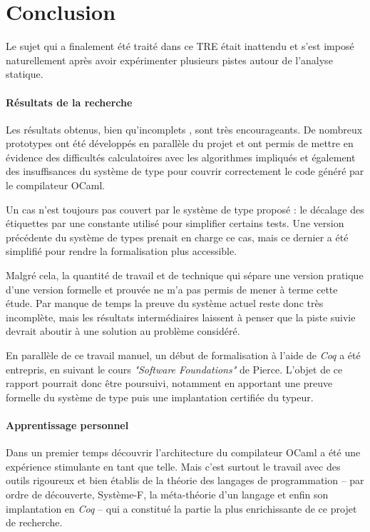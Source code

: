 \section{Conclusion}

Le sujet qui a finalement été traité dans ce TRE était inattendu et s'est
imposé naturellement après avoir expérimenter plusieurs pistes autour de
l'analyse statique.

\paragraph{Résultats de la recherche} Les résultats obtenus, bien qu'incomplets
, sont très encourageants. De nombreux prototypes ont été développés en
parallèle du projet et ont permis de mettre en évidence des difficultés
calculatoires avec les algorithmes impliqués et également des insuffisances du
système de type pour couvrir correctement le code généré par le compilateur
OCaml.

Un cas n'est toujours pas couvert par le système de type proposé : le décalage
des étiquettes par une constante utilisé pour simplifier certains tests.
Une version précédente du système de types prenait en charge ce cas, mais
ce dernier a été simplifié pour rendre la formalisation plus accessible.

Malgré cela, la quantité de travail et de technique qui sépare une version
pratique d'une version formelle et prouvée ne m'a pas permis de mener à terme
cette étude.  Par manque de temps la preuve du système actuel reste donc très
incomplète, mais les résultats intermédiaires laissent à penser que la piste
suivie devrait aboutir à une solution au problème considéré.

En parallèle de ce travail manuel, un début de formalisation à l'aide de
\emph{Coq} a été entrepris, en suivant le cours \emph{"Software Foundations"}
de Pierce. L'objet de ce rapport pourrait donc être poursuivi, notamment en
apportant une preuve formelle du système de type puis une implantation
certifiée du typeur.

\paragraph{Apprentissage personnel} Dans un premier temps découvrir
l'architecture du compilateur OCaml a été une expérience stimulante en tant que
telle. Mais c'est surtout le travail avec des outils rigoureux et bien établis
de la théorie des langages de programmation -- par ordre de découverte,
\mbox{Système-F}, la méta-théorie d'un langage et enfin son implantation en
\emph{Coq} -- qui a constitué la partie la plus enrichissante de ce projet de
recherche.
